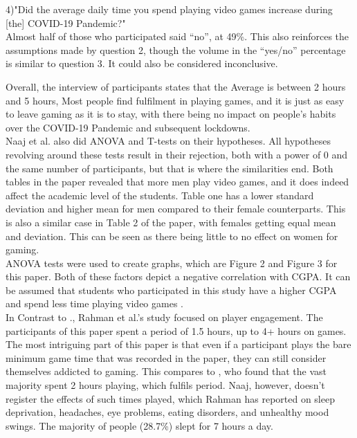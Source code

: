 \documentclass[conference]{IEEEtran}
\begin{document}
4)"Did the average daily time you spend playing video games increase during [the] COVID-19 Pandemic?"\\

Almost half of those who participated said “no”, at 49\%. This also reinforces the assumptions made by question 2, though the volume in the “yes/no” percentage is similar to question 3. It could also be considered inconclusive.

Overall, the interview of participants states that the Average is between 2 hours and 5 hours, Most people find fulfilment in playing games, and it is just as easy to leave gaming as it is to stay, with there being no impact on people’s habits over the COVID-19 Pandemic and subsequent lockdowns.\\

Naaj et al. also did ANOVA and T-tests on their hypotheses. All hypotheses revolving around these tests result in their rejection, both with a power of 0 and the same number of participants, but that is where the similarities end. Both tables in the paper revealed that more men play video games, and it does indeed affect the academic level of the students. Table one has a lower standard deviation and higher mean for men compared to their female counterparts. This is also a similar case in Table 2 of the paper, with females getting equal mean and deviation. This can be seen as there being little to no effect on women for gaming.\\

ANOVA tests were used to create graphs, which are Figure 2 and Figure 3 for this paper. Both of these factors depict a negative correlation with CGPA. It can be assumed that students who participated in this study have a higher CGPA and spend less time playing video games \cite{Naaj2021}.\\

In Contrast to \cite{Naaj2021}., Rahman et al.’s \cite{Rahman2021} study focused on player engagement. The participants of this paper spent a period of 1.5 hours, up to 4+ hours on games. The most intriguing part of this paper is that even if a participant plays the bare minimum game time that was recorded in the paper, they can still consider themselves addicted to gaming. This compares to \cite{Naaj2021}, who found that the vast majority spent 2 hours playing, which fulfils \cite{Rahman2021} period. Naaj, however, doesn’t register the effects of such times played, which Rahman has reported on sleep deprivation, headaches, eye problems, eating disorders, and unhealthy mood swings. The majority of people (28.7\%) slept for 7 hours a day.\\
\end{document}
